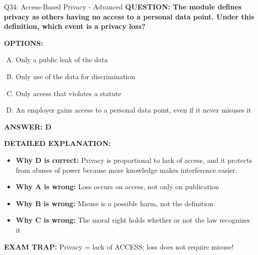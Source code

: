 \documentclass[8pt]{beamer}
\begin{document}
\begin{frame}[shrink=6]{Q34: Access-Based Privacy - Advanced}
\fontsize{6.5}{7.5}\selectfont
\textbf{QUESTION: The module defines privacy as others having no access to a personal data point. Under this definition, which event is a privacy loss?}

\vspace{0.1cm}
\textbf{OPTIONS:}
\begin{enumerate}[A.]
\item Only a public leak of the data
\item Only use of the data for discrimination
\item Only access that violates a statute
\item An employer gains access to a personal data point, even if it never misuses it
\end{enumerate}

\vspace{0.1cm}
\textcolor{myblue}{\textbf{ANSWER: D}}

\vspace{0.1cm}
\textbf{DETAILED EXPLANATION:}
\begin{itemize}
\item \textbf{Why D is correct:} Privacy is proportional to lack of access, and it protects from abuses of power because more knowledge makes interference easier.
\item \textbf{Why A is wrong:} Loss occurs on access, not only on publication
\item \textbf{Why B is wrong:} Misuse is a possible harm, not the definition
\item \textbf{Why C is wrong:} The moral right holds whether or not the law recognizes it
\end{itemize}

\textcolor{myred}{\textbf{EXAM TRAP:}} Privacy = lack of ACCESS; loss does not require misuse!
\end{frame}
\end{document}
